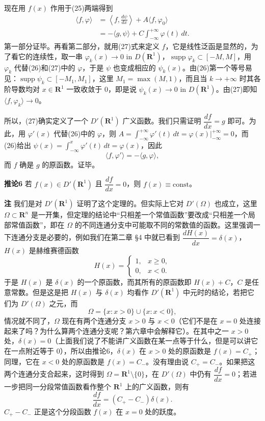 现在用 $f(x)$ 作用于(25)两端得到
\begin{equation}
\begin{aligned}
 \langle f,\varphi\rangle
 &=\left\langle f,\frac{d\psi}{dx}\right\rangle+A\langle f,\varphi_0\rangle\\
 &=-\langle g,\psi\rangle+C\int_{-\infty}^{+\infty}\varphi(t)\,dt.
\end{aligned}
\tag{27}
\end{equation}
第一部分证毕。再看第二部分，就用(27)式来定义 $f$，它是线性泛函是显然的，为了看它的连续性，取一串 $\varphi_k(x)\to0$ in $D(\mathbf R^1)$，$\operatorname{supp}\varphi_k\subset[-M,M]$，用 $\varphi_k$ 代替(26)和(27)中的 $\varphi$，于是 $\psi$ 也变成相应的 $\psi_k(x)$。由(26)第一个等号易见：$\operatorname{supp}\psi_k\subset[-M_1,M_1]$，这里 $M_1=\max(M,1)$，而且当 $k\to+\infty$ 时其各阶导数均对 $x\in\mathbf R^1$ 一致收敛于 0，即是说 $\psi_k(x)\to0$ in $D(\mathbf R^1)$。由(27)即知 $\langle f,\varphi_k\rangle\to0$。

所以，(27)确实定义了一个 $D'(\mathbf R^1)$ 广义函数。我们只需证明 $\dfrac{df}{dx}=g$ 即可。为此，用 $\varphi'(x)$ 代替(26)中的 $\varphi$，则 $A=\int_{-\infty}^{+\infty}\varphi'(t)\,dt=\varphi(x)\big|_{-\infty}^{+\infty}=0$，而(26)给出 $\psi(x)=\int_{-\infty}^{x}\varphi'(t)\,dt=\varphi(x)$，因此
\[
 \langle f,\varphi'\rangle=-\langle g,\varphi\rangle,
\]
而 $f$ 确是 $g$ 的原函数。证毕。

\noindent\textbf{推论6}
若 $f(x)\in D'(\mathbf R^1)$ 且 $\dfrac{df}{dx}=0$，则 $f(x)\equiv\mathrm{const}$。

\noindent\textbf{注}
我们是对 $D'(\mathbf R^1)$ 证明了这个定理的。但实际上它对 $D'(\Omega)$ 也成立，这里 $\Omega\subset\mathbf R^n$ 是一开集，但定理的结论中“只相差一个常值函数”要改成“只相差一个局部常值函数”，即在 $\Omega$ 的不同连通分支中可能取不同的常数值的函数。这里强调一下连通分支是必要的，例如我们在第二章 §4 中就已看到 $\dfrac{dH(x)}{dx}=\delta(x)$，$H(x)$ 是赫维赛德函数
\[
 H(x)=
 \begin{cases}
 1,&x\ge0,\\
 0,&x<0.
 \end{cases}
\]
于是 $H(x)$ 是 $\delta(x)$ 的一个原函数，而其所有的原函数即 $H(x)+C$，$C$ 是任意常数。但是这是把 $H(x)$ 与 $\delta(x)$ 均看作 $D'(\mathbf R^1)$ 中元时的结论，若把它们为 $D'(\Omega)$ 之元，而
\[
 \Omega=\{x:x>0\}\cup\{x:x<0\},
\]
情况就不同了，$\Omega$ 现在有两个连通分支 $x>0$ 与 $x<0$（它们不是在 $x=0$ 处连接起来了吗？为什么算两个连通分支呢？第六章中会解释它）。在其中之一 $x>0$ 处，$\delta(x)=0$（上面我们说了不能讲广义函数在某一点等于什么，但是可以讲它在一点附近等于 0），所以由推论6，$\delta(x)$ 在 $x>0$ 处的原函数是 $f(x)=C_+$；同理，它在 $x<0$ 处的原函数是 $f(x)=C_-$。没有理由说 $C_+=C_-$。如果把这两个连通分支合起来，这时得到 $\Omega=\mathbf R^1\setminus\{0\}$，在 $D'(\Omega)$ 中仍有 $\dfrac{df}{dx}=0$；若进一步把同一分段常值函数看作整个 $\mathbf R^1$ 上的广义函数，则有
\[
 \frac{df}{dx}=(C_+-C_-)\delta(x).
\]
$C_+-C_-$ 正是这个分段函数 $f(x)$ 在 $x=0$ 处的跃度。

